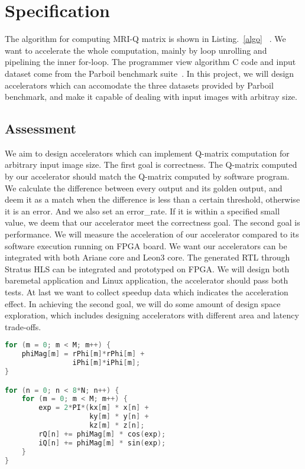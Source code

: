 \section{Specification}
The algorithm for computing MRI-Q matrix is shown in Listing.~\ref{algo}
~\cite{stone2008accelerating}. We want to accelerate the whole computation, 
mainly by loop unrolling and pipelining the inner for-loop. The programmer 
view algorithm C code and input dataset come from the Parboil benchmark 
suite~\cite{stratton2012parboil}. In this project, we will design 
accelerators which can accomodate the three datasets provided by Parboil 
benchmark, and make it capable of dealing with input images with arbitray size.


\subsection{Assessment}
We aim to design accelerators which can implement Q-matrix computation for
arbitrary input image size. The first goal is correctness. The Q-matrix 
computed by our accelerator should match the Q-matrix computed by software 
program. We calculate the difference between every output and its golden 
output, and deem it as a match when the difference is less than a certain
 threshold, otherwise it is an error. And we also set an error\_rate. If 
it is within a specified small value, we deem that our accelerator meet 
the correctness goal. The second goal is performance. We will measure the 
acceleration of our accelerator compared to its software execution running
 on FPGA board. We want our accelerators can be integrated with both Ariane
 core and Leon3 core. The generated RTL through Stratus HLS can be integrated
 and prototyped on FPGA. We will design both baremetal application and Linux 
application, the accelerator should pass both tests. At last we want to 
collect speedup data which indicates the acceleration effect. In achieving 
the second goal, we will do some amount of design space exploration, which 
includes designing accelerators with different area and latency trade-offs. 

\begin{lstlisting}[language=C, caption=Algorithm for computing MRI Q matrix, label=algo]
for (m = 0; m < M; m++) {
    phiMag[m] = rPhi[m]*rPhi[m] +
                iPhi[m]*iPhi[m];
}

for (n = 0; n < 8*N; n++) {
    for (m = 0; m < M; m++) {
        exp = 2*PI*(kx[m] * x[n] +
                    ky[m] * y[n] +
                    kz[m] * z[n];
        rQ[n] += phiMag[m] * cos(exp);
        iQ[n] += phiMag[m] * sin(exp);
    }
}
\end{lstlisting}

